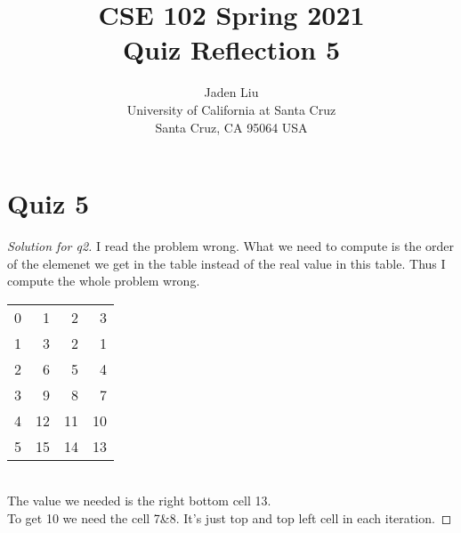 \documentclass[12pt]{article}
\begin{document}
\title{ CSE 102 Spring 2021\\
	Quiz Reflection 5}

\author{Jaden Liu \\ 
University of California at Santa Cruz\\
Santa Cruz, CA 95064 USA }

\maketitle


\section{Quiz 5} 
\begin{proof}[Solution for q2]
	I read the problem wrong. What we need to compute is the order of the elemenet we get in the table instead of the real value in this table. Thus I compute the whole problem wrong.    \begin{tabular}{rrrr}
		0     & 1     & 2     & 3 \\
		1     & 3     & 2     & 1 \\
		2     & 6     & 5     & 4 \\
		3     & 9     & 8     & 7 \\
		4     & 12    & 11    & 10 \\
		5     & 15    & 14    & 13 \\
	\end{tabular}\\
	The value we needed is the right bottom cell 13.\\
	To get 10 we need the cell 7\&8. It's just top and top left cell in each iteration.
\end{proof}

\bigskip
\end{document}

